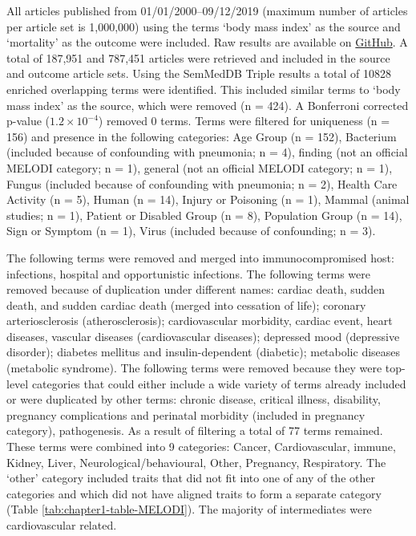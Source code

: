 \documentclass[11pt,twoside]{bristolthesis}
\begin{document}
All articles published from 01/01/2000--09/12/2019 (maximum number of articles per article set is 1,000,000) using the terms `body mass index' as the source and `mortality' as the outcome were included. Raw results are available on \href{https://github.com/mattlee821/000_thesis/index/data/chapter1}{GitHub}. A total of 187,951 and 787,451 articles were retrieved and included in the source and outcome article sets. Using the SemMedDB Triple results a total of 10828 enriched overlapping terms were identified. This included similar terms to `body mass index' as the source, which were removed (n = 424). A Bonferroni corrected p-value (\ensuremath{1.2\times 10^{-4}}) removed 0 terms. Terms were filtered for uniqueness (n = 156) and presence in the following categories: Age Group (n = 152), Bacterium (included because of confounding with pneumonia; n = 4), finding (not an official MELODI category; n = 1), general (not an official MELODI category; n = 1), Fungus (included because of confounding with pneumonia; n = 2), Health Care Activity (n = 5), Human (n = 14), Injury or Poisoning (n = 1), Mammal (animal studies; n = 1), Patient or Disabled Group (n = 8), Population Group (n = 14), Sign or Symptom (n = 1), Virus (included because of confounding; n = 3).

The following terms were removed and merged into immunocompromised host: infections, hospital and opportunistic infections. The following terms were removed because of duplication under different names: cardiac death, sudden death, and sudden cardiac death (merged into cessation of life); coronary arteriosclerosis (atherosclerosis); cardiovascular morbidity, cardiac event, heart diseases, vascular diseases (cardiovascular diseases); depressed mood (depressive disorder); diabetes mellitus and insulin-dependent (diabetic); metabolic diseases (metabolic syndrome). The following terms were removed because they were top-level categories that could either include a wide variety of terms already included or were duplicated by other terms: chronic disease, critical illness, disability, pregnancy complications and perinatal morbidity (included in pregnancy category), pathogenesis. As a result of filtering a total of 77 terms remained. These terms were combined into 9 categories: Cancer, Cardiovascular, immune, Kidney, Liver, Neurological/behavioural, Other, Pregnancy, Respiratory. The `other' category included traits that did not fit into one of any of the other categories and which did not have aligned traits to form a separate category (Table \ref{tab:chapter1-table-MELODI}). The majority of intermediates were cardiovascular related.
\end{document}
